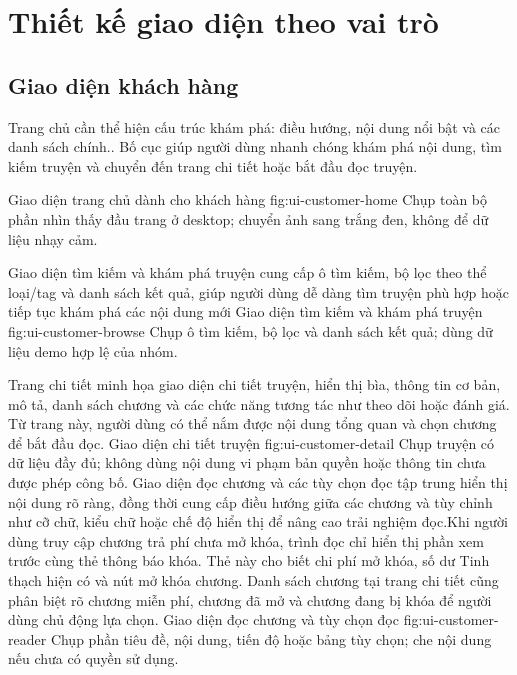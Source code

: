 \section{Thiết kế giao diện theo vai trò}



\subsection{Giao diện khách hàng}

Trang chủ cần thể hiện cấu trúc khám phá: điều hướng, nội dung nổi bật và các danh sách chính.. Bố cục giúp người dùng nhanh chóng khám phá nội dung, tìm kiếm truyện và chuyển đến trang chi tiết hoặc bắt đầu đọc truyện.


  {Giao diện trang chủ dành cho khách hàng}
  {fig:ui-customer-home}
  {Chụp toàn bộ phần nhìn thấy đầu trang ở desktop; chuyển ảnh sang trắng đen, không để dữ liệu nhạy cảm.}

Giao diện tìm kiếm và khám phá truyện cung cấp ô tìm kiếm, bộ lọc theo thể loại/tag và danh sách kết quả, giúp người dùng dễ dàng tìm truyện phù hợp hoặc tiếp tục khám phá các nội dung mới
  {Giao diện tìm kiếm và khám phá truyện}
  {fig:ui-customer-browse}
  {Chụp ô tìm kiếm, bộ lọc và danh sách kết quả; dùng dữ liệu demo hợp lệ của nhóm.}

Trang chi tiết minh họa giao diện chi tiết truyện, hiển thị bìa, thông tin cơ bản, mô tả, danh sách chương và các chức năng tương tác như theo dõi hoặc đánh giá. Từ trang này, người dùng có thể nắm được nội dung tổng quan và chọn chương để bắt đầu đọc.
  {Giao diện chi tiết truyện}
  {fig:ui-customer-detail}
  {Chụp truyện có dữ liệu đầy đủ; không dùng nội dung vi phạm bản quyền hoặc thông tin chưa được phép công bố.}
\clearpage
Giao diện đọc chương và các tùy chọn đọc tập trung hiển thị nội dung rõ ràng, đồng thời cung cấp điều hướng giữa các chương và tùy chỉnh như cỡ chữ, kiểu chữ hoặc chế độ hiển thị để nâng cao trải nghiệm đọc.Khi người dùng truy cập chương trả phí chưa mở khóa, trình đọc chỉ hiển thị phần xem trước cùng thẻ thông báo khóa. Thẻ này cho biết chi phí mở khóa, số dư Tinh thạch hiện có và nút mở khóa chương. Danh sách chương tại trang chi tiết cũng phân biệt rõ chương miễn phí, chương đã mở và chương đang bị khóa để người dùng chủ động lựa chọn.
  {Giao diện đọc chương và tùy chọn đọc}
  {fig:ui-customer-reader}
  {Chụp phần tiêu đề, nội dung, tiến độ hoặc bảng tùy chọn; che nội dung nếu chưa có quyền sử dụng.}

